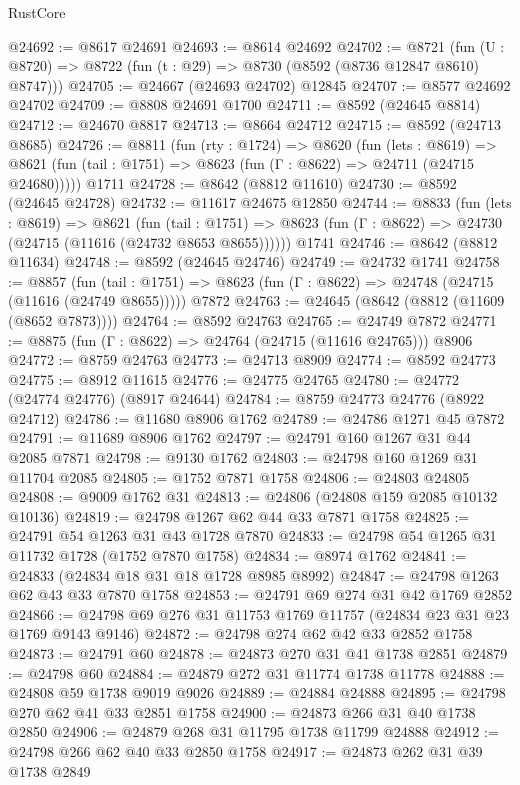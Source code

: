 \begin{lexlean}{RustCore}
\begin{coremodule}
@24692 := @8617 @24691
@24693 := @8614 @24692
@24702 := @8721
    (fun (U : @8720) => @8722 (fun (t : @29) => @8730 (@8592 (@8736 @12847 @8610) @8747)))
@24705 := @24667 (@24693 @24702) @12845
@24707 := @8577 @24692 @24702
@24709 := @8808 @24691 @1700
@24711 := @8592 (@24645 @8814)
@24712 := @24670 @8817
@24713 := @8664 @24712
@24715 := @8592 (@24713 @8685)
@24726 := @8811
    (fun (rty : @1724) =>
    @8620
      (fun (lets : @8619) =>
      @8621 (fun (tail : @1751) => @8623 (fun (Γ : @8622) => @24711 (@24715 @24680)))))
    @1711
@24728 := @8642 (@8812 @11610)
@24730 := @8592 (@24645 @24728)
@24732 := @11617 @24675 @12850
@24744 := @8833
    (fun (lets : @8619) =>
    @8621
      (fun (tail : @1751) =>
      @8623 (fun (Γ : @8622) => @24730 (@24715 (@11616 (@24732 @8653 @8655))))))
    @1741
@24746 := @8642 (@8812 @11634)
@24748 := @8592 (@24645 @24746)
@24749 := @24732 @1741
@24758 := @8857
    (fun (tail : @1751) => @8623 (fun (Γ : @8622) => @24748 (@24715 (@11616 (@24749 @8655)))))
    @7872
@24763 := @24645 (@8642 (@8812 (@11609 (@8652 @7873))))
@24764 := @8592 @24763
@24765 := @24749 @7872
@24771 := @8875 (fun (Γ : @8622) => @24764 (@24715 (@11616 @24765))) @8906
@24772 := @8759 @24763
@24773 := @24713 @8909
@24774 := @8592 @24773
@24775 := @8912 @11615
@24776 := @24775 @24765
@24780 := @24772 (@24774 @24776) (@8917 @24644)
@24784 := @8759 @24773 @24776 (@8922 @24712)
@24786 := @11680 @8906 @1762
@24789 := @24786 @1271 @45 @7872
@24791 := @11689 @8906 @1762
@24797 := @24791 @160 @1267 @31 @44 @2085 @7871
@24798 := @9130 @1762
@24803 := @24798 @160 @1269 @31 @11704 @2085
@24805 := @1752 @7871 @1758
@24806 := @24803 @24805
@24808 := @9009 @1762 @31
@24813 := @24806 (@24808 @159 @2085 @10132 @10136)
@24819 := @24798 @1267 @62 @44 @33 @7871 @1758
@24825 := @24791 @54 @1263 @31 @43 @1728 @7870
@24833 := @24798 @54 @1265 @31 @11732 @1728 (@1752 @7870 @1758)
@24834 := @8974 @1762
@24841 := @24833 (@24834 @18 @31 @18 @1728 @8985 @8992)
@24847 := @24798 @1263 @62 @43 @33 @7870 @1758
@24853 := @24791 @69 @274 @31 @42 @1769 @2852
@24866 := @24798 @69 @276 @31 @11753 @1769 @11757 (@24834 @23 @31 @23 @1769 @9143 @9146)
@24872 := @24798 @274 @62 @42 @33 @2852 @1758
@24873 := @24791 @60
@24878 := @24873 @270 @31 @41 @1738 @2851
@24879 := @24798 @60
@24884 := @24879 @272 @31 @11774 @1738 @11778
@24888 := @24808 @59 @1738 @9019 @9026
@24889 := @24884 @24888
@24895 := @24798 @270 @62 @41 @33 @2851 @1758
@24900 := @24873 @266 @31 @40 @1738 @2850
@24906 := @24879 @268 @31 @11795 @1738 @11799 @24888
@24912 := @24798 @266 @62 @40 @33 @2850 @1758
@24917 := @24873 @262 @31 @39 @1738 @2849

\end{coremodule}
\end{lexlean}
